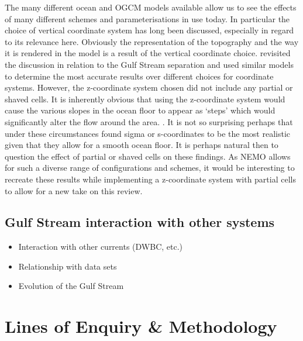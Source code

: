 \documentclass[a4paper,11pt]{article}
\begin{document}
The many different ocean and OGCM models available allow us to see the effects of many different schemes and parameterisations in use today. In particular the choice of vertical coordinate system has long been discussed, especially in regard to its relevance here. Obviously the representation of the topography and the way it is rendered in the model is a result of the vertical coordinate choice. \citep{Ezer2016b} revisited the discussion in relation to the Gulf Stream separation and used similar models to determine the most accurate results over different choices for coordinate systems. However, the z-coordinate system chosen did not include any partial or shaved cells. It is inherently obvious that using the z-coordinate system would cause the various slopes in the ocean floor to appear as ‘steps’ which would significantly alter the flow around the area. . It is not so surprising perhaps that under these circumstances \citep{Ezer2016b} found sigma or s-coordinates to be the most realistic given that they allow for a smooth ocean floor. It is perhaps natural then to question the effect of partial or shaved cells on these findings. As NEMO allows for such a diverse range of configurations and schemes, it would be interesting to recreate these results while implementing a z-coordinate system with partial cells to allow for a new take on this review. 

\subsection{Gulf Stream interaction with other systems}
\begin{itemize}
  \item Interaction with other currents   (DWBC, etc.)
  \item Relationship with data sets
  \item Evolution of the Gulf Stream
\end{itemize}



\section{Lines of Enquiry \& Methodology}
\end{document}
